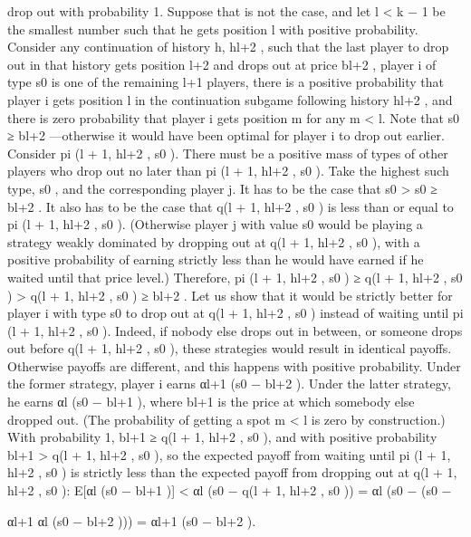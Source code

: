 \documentclass[10pt]{article}
\begin{document}
\begin{ReviewVerbatim}
drop out with probability 1. Suppose that is not the case, and let l < k − 1 be the smallest number
such that he gets position l with positive probability.
Consider any continuation of history h, hl+2 , such that the last player to drop out in that history
gets position l+2 and drops out at price bl+2 , player i of type s0 is one of the remaining l+1 players,
there is a positive probability that player i gets position l in the continuation subgame following
history hl+2 , and there is zero probability that player i gets position m for any m < l. Note
that s0 ≥ bl+2 —otherwise it would have been optimal for player i to drop out earlier. Consider
pi (l + 1, hl+2 , s0 ). There must be a positive mass of types of other players who drop out no
later than pi (l + 1, hl+2 , s0 ). Take the highest such type, s0 , and the corresponding player j.
It has to be the case that s0 > s0 ≥ bl+2 . It also has to be the case that q(l + 1, hl+2 , s0 ) is
less than or equal to pi (l + 1, hl+2 , s0 ). (Otherwise player j with value s0 would be playing a
strategy weakly dominated by dropping out at q(l + 1, hl+2 , s0 ), with a positive probability of
earning strictly less than he would have earned if he waited until that price level.) Therefore,
pi (l + 1, hl+2 , s0 ) ≥ q(l + 1, hl+2 , s0 ) > q(l + 1, hl+2 , s0 ) ≥ bl+2 . Let us show that it would be
strictly better for player i with type s0 to drop out at q(l + 1, hl+2 , s0 ) instead of waiting until
pi (l + 1, hl+2 , s0 ). Indeed, if nobody else drops out in between, or someone drops out before
q(l + 1, hl+2 , s0 ), these strategies would result in identical payoffs. Otherwise payoffs are different,
and this happens with positive probability. Under the former strategy, player i earns
αl+1 (s0 − bl+2 ).
Under the latter strategy, he earns
αl (s0 − bl+1 ),
where bl+1 is the price at which somebody else dropped out. (The probability of getting a spot
m < l is zero by construction.) With probability 1, bl+1 ≥ q(l + 1, hl+2 , s0 ), and with positive
probability bl+1 > q(l + 1, hl+2 , s0 ), so the expected payoff from waiting until pi (l + 1, hl+2 , s0 ) is
strictly less than the expected payoff from dropping out at q(l + 1, hl+2 , s0 ): E[αl (s0 − bl+1 )] <
αl (s0 − q(l + 1, hl+2 , s0 )) = αl (s0 − (s0 −

αl+1
αl (s0 − bl+2 ))) = αl+1 (s0 − bl+2 ).


\end{ReviewVerbatim}
\end{document}
